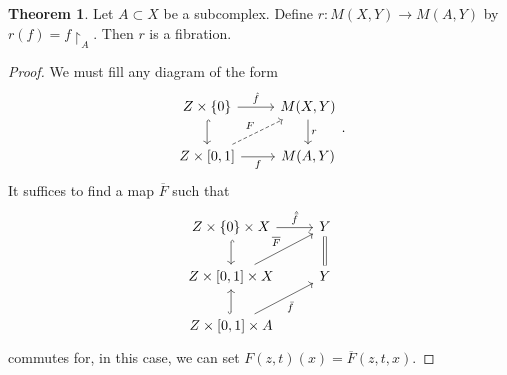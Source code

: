 \documentclass[10pt,letterpaper,cm]{nupset}
\theoremstyle{definition}
\theoremstyle{theorem}
\newtheorem{theorem}[defn]{Theorem}
\theoremstyle{remark}
\newcommand{\1}{\mathbb{1}}
\newcommand{\0}{\vec 0}
\begin{document}
\begin{theorem}
Let $A\subset X$ be a subcomplex. Define $r: M(X, Y) \to M(A, Y)$ by $r(f) = f\restriction_A$. Then $r$ is a fibration. 
\end{theorem}
\begin{proof}
We must fill any diagram of the form
\[
\begin{tikzcd}
Z\times \{0\} \arrow[r, "\hat{f}"] \arrow[d, hook]                 & {M(X,Y)} \arrow[d, "r"] \\
{Z\times [0,1]} \arrow[ru, "F", dashed] \arrow[r, "f"'] & {M(A,Y)}               
\end{tikzcd}
.\] It suffices to find a map $\overline{F}$ such that
\[
\begin{tikzcd}
Z\times \{0\}\times X \arrow[r, "\hat{\bar{f}}"] \arrow[d, hook] & Y \arrow[d, equals] \\
{Z\times [0,1]\times X} \arrow[ru, "\overline{F}"]               & Y           \\
{Z\times [0,1]\times A} \arrow[u, hook] \arrow[ru, "\bar{f}"']   &            
\end{tikzcd}
\] commutes for, in this case, we can set $F(z,t)(x) = \overline{F}(z, t, x)$.


\end{proof}
\end{document}
